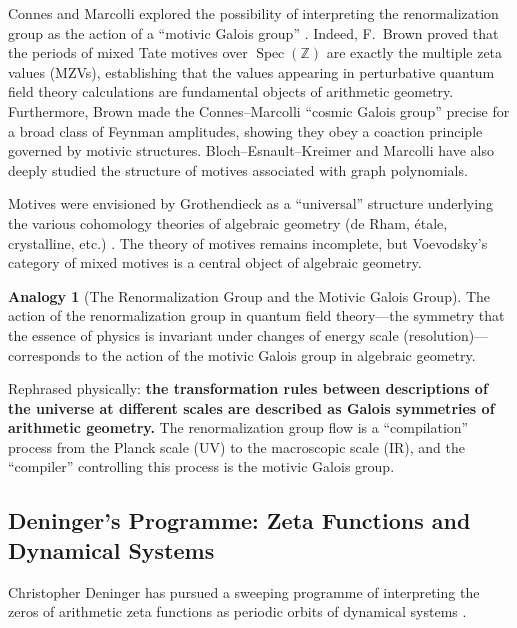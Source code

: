 \documentclass[12pt,a4paper]{article}
\theoremstyle{definition}
\newtheorem{analogy}[definition]{Analogy}
\newcommand{\Spec}{\operatorname{Spec}}
\begin{document}
Connes and Marcolli explored the possibility of interpreting the renormalization group as the action of a ``motivic Galois group'' \cite{ConnesMarcolli2008, ConnesMarcolli2004}. Indeed, F.~Brown \cite{Brown2012} proved that the periods of mixed Tate motives over $\Spec(\mathbb{Z})$ are exactly the multiple zeta values (MZVs), establishing that the values appearing in perturbative quantum field theory calculations are fundamental objects of arithmetic geometry. Furthermore, Brown \cite{Brown2017} made the Connes--Marcolli ``cosmic Galois group'' precise for a broad class of Feynman amplitudes, showing they obey a coaction principle governed by motivic structures. Bloch--Esnault--Kreimer \cite{BlochEsnaultKreimer2006} and Marcolli \cite{Marcolli2010} have also deeply studied the structure of motives associated with graph polynomials.

Motives were envisioned by Grothendieck as a ``universal'' structure underlying the various cohomology theories of algebraic geometry (de Rham, \'etale, crystalline, etc.) \cite{Grothendieck1969}. The theory of motives remains incomplete, but Voevodsky's category of mixed motives \cite{Voevodsky2000} is a central object of algebraic geometry.

\begin{analogy}[The Renormalization Group and the Motivic Galois Group]
The action of the renormalization group in quantum field theory---the symmetry that the essence of physics is invariant under changes of energy scale (resolution)---corresponds to the action of the motivic Galois group in algebraic geometry.

Rephrased physically: \textbf{the transformation rules between descriptions of the universe at different scales are described as Galois symmetries of arithmetic geometry.} The renormalization group flow is a ``compilation'' process from the Planck scale (UV) to the macroscopic scale (IR), and the ``compiler'' controlling this process is the motivic Galois group.
\end{analogy}

\subsection{Deninger's Programme: Zeta Functions and Dynamical Systems}

Christopher Deninger has pursued a sweeping programme of interpreting the zeros of arithmetic zeta functions as periodic orbits of dynamical systems \cite{Deninger1998, Deninger2002}.
\end{document}
